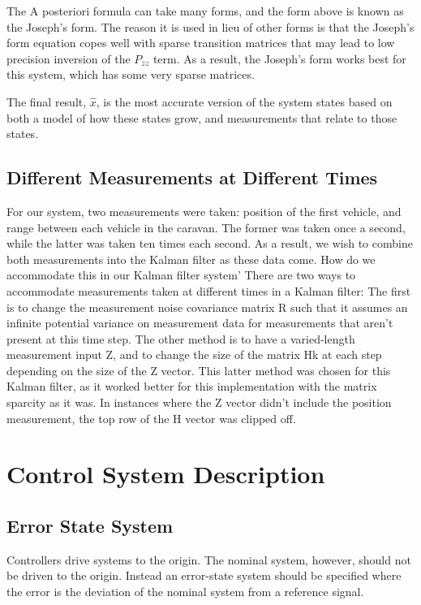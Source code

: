 \documentclass[12pt,onecolumn,reqno]{amsart}
\begin{document}
The A posteriori formula can take many forms, and the form above is known as the
Joseph's form. The reason it is used in lieu of other forms is that the Joseph's
form equation copes well with sparse transition matrices that may lead to low
precision inversion of the $P_{zz}$ term. As a result, the Joseph's form works
best for this system, which has some very sparse matrices.

The final result, $\hat{x}$, is the most accurate version of the system states
based on both a model of how these states grow, and measurements that relate to
those states.

\subsection{Different Measurements at Different Times}
For our system, two measurements were taken: position of the first vehicle, and
range between each vehicle in the caravan. The former was taken once a second,
while the latter was taken ten times each second. As a result, we wish to
combine both measurements into the Kalman filter as these data come. How do we
accommodate this in our Kalman filter system' There are two ways to accommodate
measurements taken at different times in a Kalman filter: The first is to change
the measurement noise covariance matrix R such that it assumes an infinite
potential variance on measurement data for measurements that aren't present at
this time step. The other method is to have a varied-length measurement input Z,
and to change the size of the matrix Hk at each step depending on the size of
the Z vector. This latter method was chosen for this Kalman filter, as it worked
better for this implementation with the matrix sparcity as it was. In instances
where the Z vector didn't include the position measurement, the top row of the H
vector was clipped off.

\section{Control System Description}
\subsection{Error State System}
Controllers drive systems to the origin. The nominal system, however, should not
be driven to the origin. Instead an error-state system should be specified where
the error is the deviation of the nominal system from a reference signal.
\end{document}
